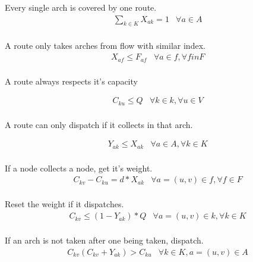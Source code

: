 Every single arch is covered by one route. \\

\begin{align*}
    &\sum_{k \in K}{X_{ak} = 1} & \forall a \in A \\
\end{align*}

A route only takes arches from flow with similar index. \\

\begin{align*}
    &X_{af} \leq F_{af} & \forall a \in f, \forall f in F \\
\end{align*}

A route always respects it's capacity

\begin{align*}
    &C_{ku} \leq Q & \forall k \in k, \forall u \in V \\
\end{align*}

A route can only dispatch if it collects in that arch.

\begin{align*}
    &Y_{ak} \leq X_{ak} & \forall a \in A, \forall k \in K \\
\end{align*}

If a node collects a node, get it's weight. \\

\begin{align*}
    &C_{kv} - C_{ku} = d * X_{ak} & \forall a=(u,v) \in f, \forall f \in F \\
\end{align*}

Reset the weight if it dispatches. \\

\begin{align*}
    &C_{kv} \leq (1 - Y_{ak}) * Q & \forall a=(u,v) \in k, \forall k \in K \\
\end{align*}

If an arch is not taken after one being taken, dispatch. \\

\begin{align*}
    &C_{kv} (C_{kv} + Y_{ak}) > C_{ku} & \forall k \in K, a=(u,v) \in A
\end{align*}